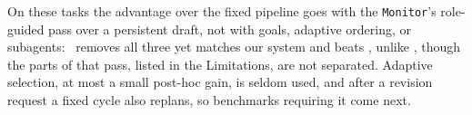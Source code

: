 On these tasks the advantage over the fixed pipeline goes with the \texttt{Monitor}'s role-guided pass over a persistent draft, not with goals, adaptive ordering, or subagents: \condLoopOnly\ removes all three yet matches our system and beats \condStaged, unlike \condStagedRoles, though the parts of that pass, listed in the Limitations, are not separated.
Adaptive selection, at most a small post-hoc gain, is seldom used, and after a revision request a fixed cycle also replans, so benchmarks requiring it come next.
